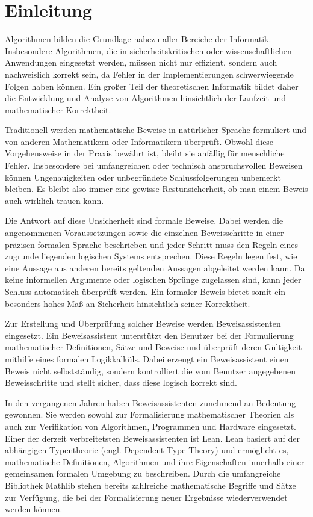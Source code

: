 \section{Einleitung}

Algorithmen bilden die Grundlage nahezu aller Bereiche der Informatik.
Insbesondere Algorithmen, die in sicherheitskritischen oder wissenschaftlichen Anwendungen eingesetzt werden, müssen nicht nur effizient,
sondern auch nachweislich korrekt sein, da Fehler in der Implementierungen schwerwiegende Folgen haben können.
Ein großer Teil der theoretischen Informatik bildet daher die Entwicklung und Analyse von Algorithmen hinsichtlich der Laufzeit und mathematischer Korrektheit.


Traditionell werden mathematische Beweise in natürlicher Sprache formuliert und von anderen Mathematikern oder Informatikern überprüft.
Obwohl diese Vorgehensweise in der Praxis bewährt ist, bleibt sie anfällig für menschliche Fehler.
Insbesondere bei umfangreichen oder technisch anspruchsvollen Beweisen können Ungenauigkeiten oder unbegründete Schlussfolgerungen unbemerkt bleiben.
Es bleibt also immer eine gewisse Restunsicherheit, ob man einem Beweis auch wirklich trauen kann.

Die Antwort auf diese Unsicherheit sind formale Beweise.
Dabei werden die angenommenen Voraussetzungen sowie die einzelnen Beweisschritte in einer präzisen formalen Sprache beschrieben 
und jeder Schritt muss den Regeln eines zugrunde liegenden logischen Systems entsprechen.
Diese Regeln legen fest, wie eine Aussage aus anderen bereits geltenden Aussagen abgeleitet werden kann.
Da keine informellen Argumente oder logischen Sprünge zugelassen sind, kann jeder Schluss automatisch überprüft werden.
Ein formaler Beweis bietet somit ein besonders hohes Maß an Sicherheit hinsichtlich seiner Korrektheit.

Zur Erstellung und Überprüfung solcher Beweise werden Beweisassistenten eingesetzt.
Ein Beweisassistent unterstützt den Benutzer bei der Formulierung mathematischer Definitionen, Sätze und Beweise und überprüft deren Gültigkeit mithilfe eines formalen Logikkalküls.
Dabei erzeugt ein Beweisassistent einen Beweis nicht selbstständig, sondern kontrolliert die vom Benutzer angegebenen Beweisschritte und stellt sicher, dass diese logisch korrekt sind.

In den vergangenen Jahren haben Beweisassistenten zunehmend an Bedeutung gewonnen.
Sie werden sowohl zur Formalisierung mathematischer Theorien als auch zur Verifikation von Algorithmen, Programmen und Hardware eingesetzt.
Einer der derzeit verbreitetsten Beweisassistenten ist Lean.
Lean basiert auf der abhängigen Typentheorie (engl. Dependent Type Theory) und ermöglicht es, mathematische Definitionen,
Algorithmen und ihre Eigenschaften innerhalb einer gemeinsamen formalen Umgebung zu beschreiben.
Durch die umfangreiche Bibliothek Mathlib stehen bereits zahlreiche mathematische Begriffe und Sätze zur Verfügung,
die bei der Formalisierung neuer Ergebnisse wiederverwendet werden können.

